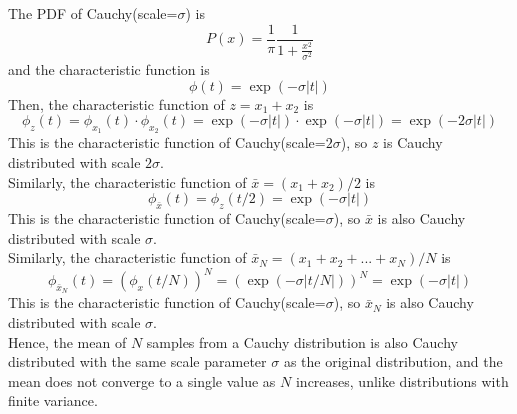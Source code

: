 \documentclass[12pt, a4paper]{article}
\begin{document}
\begin{sol}
The PDF of Cauchy(scale=$\sigma$) is $$P(x) = \frac{1}{\pi} \frac{1}{1 + \frac{x^2}{\sigma^2}}$$
and the characteristic function is $$\phi(t) = \exp(-\sigma |t|)$$
Then, the characteristic function of $z = x_1 + x_2$ is $$\phi_z(t) = \phi_{x_1}(t) \cdot \phi_{x_2}(t) = \exp(-\sigma |t|) \cdot \exp(-\sigma |t|) = \exp(-2\sigma |t|)$$
This is the characteristic function of Cauchy(scale=$2\sigma$), so $z$ is Cauchy distributed with scale $2\sigma$. \\
Similarly, the characteristic function of $\bar{x} = (x_1 + x_2)/2$ is $$\phi_{\bar{x}}(t) = \phi_z(t/2) = \exp(-\sigma |t|)$$
This is the characteristic function of Cauchy(scale=$\sigma$), so $\bar{x}$ is also Cauchy distributed with scale $\sigma$. \\
Similarly, the characteristic function of $\bar{x}_N = (x_1 + x_2 + ... + x_N)/N$ is $$\phi_{\bar{x}_N}(t) = (\phi_x(t/N))^N = (\exp(-\sigma |t/N|))^N = \exp(-\sigma |t|)$$
This is the characteristic function of Cauchy(scale=$\sigma$), so $\bar{x}_N$ is also Cauchy distributed with scale $\sigma$. \\
Hence, the mean of $N$ samples from a Cauchy distribution is also Cauchy distributed with the same scale parameter $\sigma$ as the original distribution, and the mean does not converge to a single value as $N$ increases, unlike distributions with finite variance. 
\end{sol}
\bigskip
\end{document}
